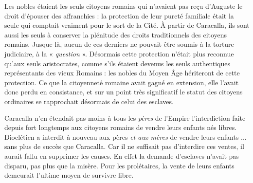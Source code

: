  Les nobles étaient les seuls citoyens romains qui n'avaient pas reçu d'Auguste le droit d'épouser des affranchies : la protection de leur pureté familiale était la seule qui comptait vraiment pour le sort de la Cité. À partir de Caracalla, ils sont aussi les seuls à conserver la plénitude des droits traditionnels des citoyens romains. Jusque là, aucun de ces derniers ne pouvait être soumis à la torture judiciaire, à la « \emph{question} ». Désormais cette protection n'était plus reconnue qu'aux seuls aristocrates, comme s'ils étaient devenus les seuls authentiques représentants des vieux Romains : les nobles du Moyen Âge hériteront de cette protection. Ce que la citoyenneté romaine avait gagné en extension, elle l'avait donc perdu en consistance, et sur un point très significatif le statut des citoyens ordinaires se rapprochait désormais de celui des esclaves.

 Caracalla n'en étendait pas moins à tous les \emph{pères} de l'Empire l'interdiction faite depuis fort longtemps aux citoyens romains de vendre leurs enfants nés libres. Dioclétien a interdit à nouveau aux pères \emph{et aux mères} de vendre leurs enfants ... sans plus de succès que Caracalla. Car il ne suffisait pas d'interdire ces ventes, il aurait fallu en supprimer les causes. En effet la demande d'esclaves n'avait pas disparu, pas plus que la misère. Pour les prolétaires, la vente de leurs enfants demeurait l'ultime moyen de survivre libre.
 
 